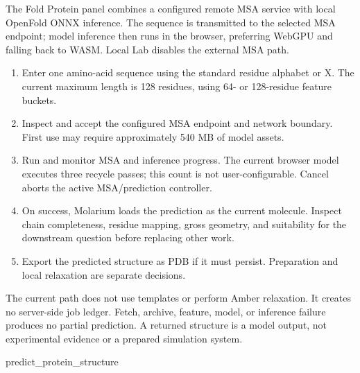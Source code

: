 \documentclass[11pt]{article}
\begin{document}
The Fold Protein panel combines a configured remote MSA service with local OpenFold ONNX inference. The sequence is transmitted to the selected MSA endpoint; model inference then runs in the browser, preferring WebGPU and falling back to WASM. Local Lab disables the external MSA path.


\begin{enumerate}
\item Enter one amino-acid sequence using the standard residue alphabet or X. The current maximum length is 128 residues, using 64- or 128-residue feature buckets.
\item Inspect and accept the configured MSA endpoint and network boundary. First use may require approximately 540 MB of model assets.
\item Run and monitor MSA and inference progress. The current browser model executes three recycle passes; this count is not user-configurable. Cancel aborts the active MSA/prediction controller.
\item On success, Molarium loads the prediction as the current molecule. Inspect chain completeness, residue mapping, gross geometry, and suitability for the downstream question before replacing other work.
\item Export the predicted structure as PDB if it must persist. Preparation and local relaxation are separate decisions.
\end{enumerate}

The current path does not use templates or perform Amber relaxation. It creates no server-side job ledger. Fetch, archive, feature, model, or inference failure produces no partial prediction. A returned structure is a model output, not experimental evidence or a prepared simulation system.

\begin{skillcontract}{predict\_protein\_structure}
\end{skillcontract}
\end{document}
